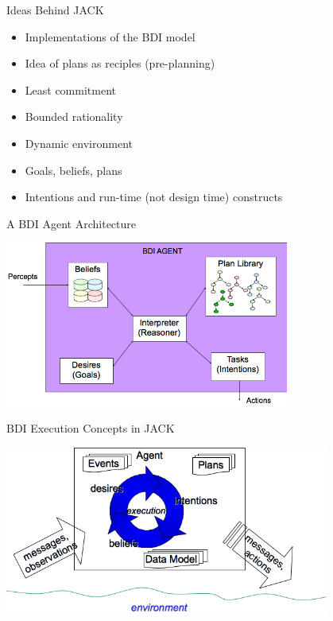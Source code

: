 \documentclass[aspectratio=1610,xcolor=dvipsnames,t]{beamer}
\begin{document}
\begin{frame}{Ideas Behind JACK} 
    \begin{itemize} 
        \item Implementations of the BDI model
        \item Idea of plans as reciples (pre-planning) 
        \item Least commitment 
        \item Bounded rationality
        \item Dynamic environment
        \item Goals, beliefs, plans
        \item Intentions and run-time (not design time) constructs
    \end{itemize} 
\end{frame} 

\begin{frame}{A BDI Agent Architecture} 
    \begin{center} 
        \includegraphics[width=0.7\textwidth]{reasoner} 
    \end{center} 
\end{frame} 

\begin{frame}{BDI Execution Concepts in JACK} 
    \begin{center}
        \includegraphics[width=0.8\textwidth]{execution} 
    \end{center} 
\end{frame} 
\end{document}
